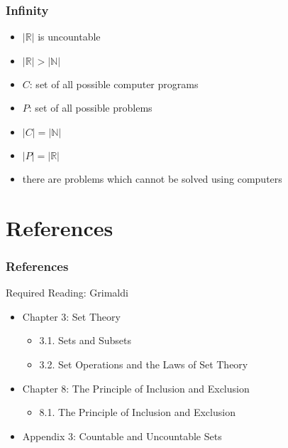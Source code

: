 \documentclass[dvipsnames]{beamer}
\begin{document}
\begin{frame}
  \frametitle{Infinity}

  \begin{itemize}
    \item $|\mathbb{R}|$ is uncountable
    \item $|\mathbb{R}| > |\mathbb{N}|$

    \pause
    \medskip
    \item $C$: set of all possible computer programs
    \item $P$: set of all possible problems
    \item $|C| = |\mathbb{N}|$
    \item $|P| = |\mathbb{R}|$

    \pause
    \medskip
    \item there are problems which cannot be solved using computers
  \end{itemize}
\end{frame}

\section*{References}

\begin{frame}
  \frametitle{References}

  \begin{block}{Required Reading: Grimaldi}
    \begin{itemize}
      \item Chapter 3: Set Theory
      \begin{itemize}
        \item 3.1. \alert{Sets and Subsets}
        \item 3.2. \alert{Set Operations and the Laws of Set Theory}
      \end{itemize}

      \item Chapter 8: The Principle of Inclusion and Exclusion
      \begin{itemize}
        \item 8.1. \alert{The Principle of Inclusion and Exclusion}
      \end{itemize}

      \item Appendix 3: \alert{Countable and Uncountable Sets}
    \end{itemize}
  \end{block}
\end{frame}
\end{document}
